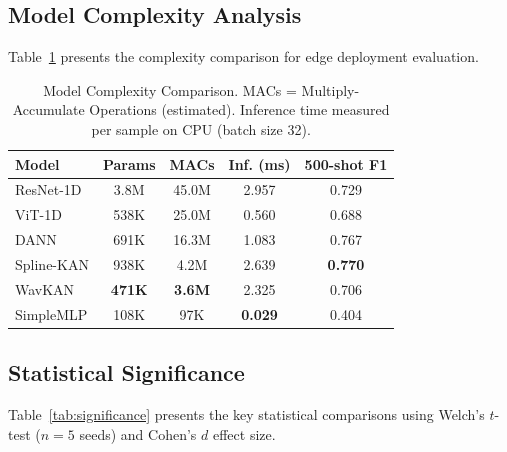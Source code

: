 \documentclass[journal,twoside,web]{ieeecolor}
\begin{document}
\subsection{Model Complexity Analysis}

Table~\ref{tab:complexity} presents the complexity comparison for edge deployment evaluation.

\begin{table}[!t]
\centering
\caption{Model Complexity Comparison. MACs = Multiply-Accumulate Operations (estimated). Inference time measured per sample on CPU (batch size 32).}
\label{tab:complexity}
\begin{tabular}{@{}lcccc@{}}
\toprule
\textbf{Model} & \textbf{Params} & \textbf{MACs} & \textbf{Inf. (ms)} & \textbf{500-shot F1} \\
\midrule
ResNet-1D       & 3.8M & 45.0M & 2.957 & 0.729 \\
ViT-1D          & 538K & 25.0M & 0.560 & 0.688 \\
DANN            & 691K & 16.3M & 1.083 & 0.767 \\
Spline-KAN      & 938K & 4.2M  & 2.639 & \textbf{0.770} \\
WavKAN          & \textbf{471K} & \textbf{3.6M}  & 2.325 & 0.706 \\
SimpleMLP       & 108K & 97K   & \textbf{0.029} & 0.404 \\
\bottomrule
\end{tabular}
\end{table}

\subsection{Statistical Significance}

Table~\ref{tab:significance} presents the key statistical comparisons using Welch's $t$-test ($n=5$ seeds) and Cohen's $d$ effect size.
\end{document}
